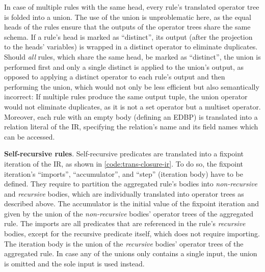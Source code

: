 In case of multiple rules with the same head,
every rule's translated operator tree is folded into a union.
The use of the union is unproblematic here, as the equal heads of the rules
ensure that the outputs of the operator trees share the same schema.
If a rule's head is marked as ``distinct'', its output (after the projection
to the heads' variables) is wrapped in a distinct operator to eliminate
duplicates.
Should \emph{all} rules, which share the same head, be marked as ``distinct'',
the union is performed first and only a single distinct is applied to the union's
output, as opposed to applying a distinct operator to each rule's output and
then performing the union, which would not only be less efficient but also
semantically incorrect:
If multiple rules produce the same output tuple, the union operator would
not eliminate duplicates, as it is not a set operator but a multiset operator.
Moreover, each rule with an empty body (defining an \ac{EDBP})
is translated into a relation literal of the \ac{IR},
specifying the relation's name and its field names which can be accessed.

\textbf{Self-recursive rules}.
Self-recursive predicates are translated into a fixpoint iteration of the \ac{IR},
as shown in \ref{code:trans-closure-ir}.
To do so, the fixpoint iteration's ``imports'', ``accumulator'', and ``step''
(iteration body) have to be defined.
They require to partition the aggregated rule's bodies into \emph{non-recursive}
and \emph{recursive} bodies, which are individually translated into operator trees
as described above.
The accumulator is the initial value of the fixpoint iteration and given by
the union of the \emph{non-recursive} bodies' operator trees of the aggregated rule.
The imports are all predicates that are referenced in the rule's \emph{recursive}
bodies, except for the recursive predicate itself, which does not require importing.
The iteration body is the union of the \emph{recursive} bodies' operator trees
of the aggregated rule.
In case any of the unions only contains a single input, the union is omitted
and the sole input is used instead.


